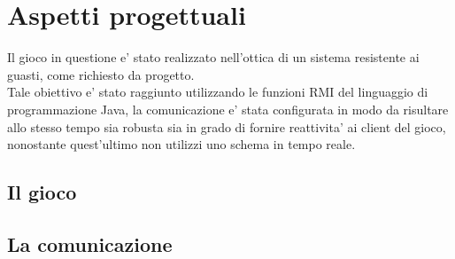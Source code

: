 \section{Aspetti progettuali}
	Il gioco in questione e' stato realizzato nell'ottica di un sistema
	resistente ai guasti, come richiesto da progetto.\\
	Tale obiettivo e' stato raggiunto utilizzando le funzioni RMI del
	linguaggio di programmazione Java, la comunicazione e' stata configurata
	in modo da risultare allo stesso tempo sia robusta sia in grado di
	fornire reattivita' ai client del gioco,
	nonostante quest'ultimo non utilizzi uno schema in tempo reale.\\

\subsection{Il gioco}
\subsection{La comunicazione}
